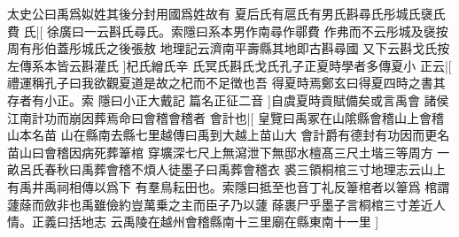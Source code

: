 太史公曰禹爲姒姓其後分封用國爲姓故有%
夏后氏有扈氏有男氏斟尋氏彤城氏襃氏費%
氏|[%
徐廣曰一云斟氏尋氏。索隱曰系本男作南尋作鄩費%
作弗而不云彤城及襃按周有彤伯蓋彤城氏之後張敖%
%
地理記云濟南平壽縣其地即古斟尋國%
又下云斟戈氏按左傳系本皆云斟灌氏%
]杞氏繒氏辛%
氏冥氏斟氏戈氏孔子正夏時學者多傳夏小%
正云|[%
禮運稱孔子曰我欲觀夏道是故之杞而不足徴也吾%
得夏時焉鄭玄曰得夏四時之書其存者有小正。索%
%
隱曰小正大戴記%
篇名正征二音%
]自虞夏時貢賦備矣或言禹會%
諸侯江南計功而崩因葬焉命曰會稽會稽者%
會計也|[%
皇覽曰禹冢在山隂縣會稽山上會稽山本名苗%
山在縣南去縣七里越傳曰禹到大越上苗山大%
%
會計爵有德封有功因而更名苗山曰會稽因病死葬𥯤棺%
穿壙深七尺上無瀉泄下無邸水檀髙三尺土堦三等周方%
%
一畝呂氏春秋曰禹葬會稽不煩人徒墨子曰禹葬會稽衣%
裘三領桐棺三寸地理志云山上有禹井禹祠相傳以爲下%
%
有羣鳥耘田也。索隱曰抵至也音丁礼反𥯤棺者以𥯤爲%
棺謂蘧蒢而斂非也禹雖儉約豈萬乗之主而臣子乃以蘧%
%
蒢裹尸乎墨子言桐棺三寸差近人情。正義曰括地志%
云禹陵在越州會稽縣南十三里廟在縣東南十一里%
]
